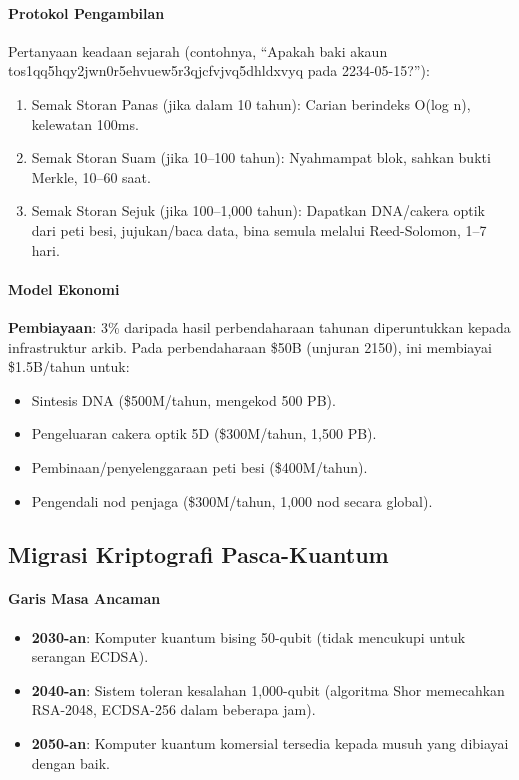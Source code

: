 \documentclass[11pt]{article}
\begin{document}
\paragraph{Protokol Pengambilan}
Pertanyaan keadaan sejarah (contohnya, ``Apakah baki akaun tos1qq5hqy2jwn0r5ehvuew5r3qjcfvjvq5dhldxvyq pada 2234-05-15?''):
\begin{enumerate}[noitemsep]
  \item Semak Storan Panas (jika dalam 10 tahun): Carian berindeks O(log n), kelewatan 100ms.
  \item Semak Storan Suam (jika 10--100 tahun): Nyahmampat blok, sahkan bukti Merkle, 10--60 saat.
  \item Semak Storan Sejuk (jika 100--1,000 tahun): Dapatkan DNA/cakera optik dari peti besi, jujukan/baca data, bina semula melalui Reed-Solomon, 1--7 hari.
\end{enumerate}

\paragraph{Model Ekonomi}
\textbf{Pembiayaan}: 3\% daripada hasil perbendaharaan tahunan diperuntukkan kepada infrastruktur arkib. Pada perbendaharaan \$50B (unjuran 2150), ini membiayai \$1.5B/tahun untuk:
\begin{itemize}[noitemsep]
  \item Sintesis DNA (\$500M/tahun, mengekod 500 PB).
  \item Pengeluaran cakera optik 5D (\$300M/tahun, 1,500 PB).
  \item Pembinaan/penyelenggaraan peti besi (\$400M/tahun).
  \item Pengendali nod penjaga (\$300M/tahun, 1,000 nod secara global).
\end{itemize}

\subsection{Migrasi Kriptografi Pasca-Kuantum}

\paragraph{Garis Masa Ancaman}
\begin{itemize}[noitemsep]
  \item \textbf{2030-an}: Komputer kuantum bising 50-qubit (tidak mencukupi untuk serangan ECDSA).
  \item \textbf{2040-an}: Sistem toleran kesalahan 1,000-qubit (algoritma Shor memecahkan RSA-2048, ECDSA-256 dalam beberapa jam).
  \item \textbf{2050-an}: Komputer kuantum komersial tersedia kepada musuh yang dibiayai dengan baik.
\end{itemize}
\end{document}

